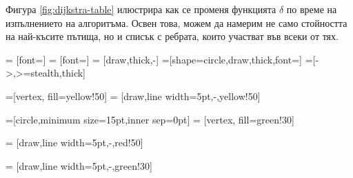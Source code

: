 Фигура \ref{fig:dijkstra-table} илюстрира как се променя функцията $\delta$ по време на изпълнението на алгоритъма.
Освен това, можем да намерим не само стойността на най-късите пътища, но
и списък с ребрата, които участват във всеки от тях.

 = [font=\small]
 = [font=\small]
 = [draw,thick,-]
=[shape=circle,draw,thick,font=\small]
=[->,>=stealth,thick]

=[vertex, fill=yellow!50]
 = [draw,line width=5pt,-,yellow!50]

=[circle,minimum size=15pt,inner sep=0pt]
 = [vertex, fill=green!30]

 = [draw,line width=5pt,-,red!50]

 = [draw,line width=5pt,-,green!30]


